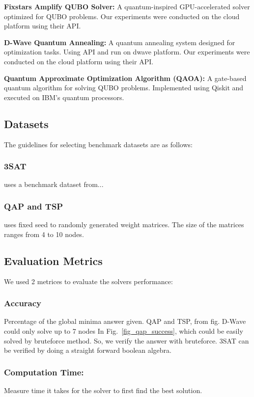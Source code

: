 \documentclass[conference]{IEEEtran}
\begin{document}
\textbf{Fixstars Amplify QUBO Solver:} A quantum-inspired GPU-accelerated solver optimized for QUBO problems. Our experiments were conducted on the cloud platform using their API.

\textbf{D-Wave Quantum Annealing:} A quantum annealing system designed for optimization tasks. Using API and run on dwave platform. Our experiments were conducted on the cloud platform using their API.

\textbf{Quantum Approximate Optimization Algorithm (QAOA):} A gate-based quantum algorithm for solving QUBO problems. Implemented using Qiskit and executed on IBM's quantum processors. 

\subsection{Datasets}
The guidelines for selecting benchmark datasets are as follows:

\subsubsection{3SAT} uses a benchmark dataset from... 
\subsubsection{QAP and TSP} uses fixed seed to randomly generated weight matrices. The size of the matrices ranges from 4 to 10 nodes.

\subsection{Evaluation Metrics}
We used 2 metrices to evaluate the solvers performance:

\subsubsection{Accuracy} Percentage of the global minima answer given. QAP and TSP, from fig. D-Wave could only solve up to 7 nodes In Fig.~\ref{fig_qap_success},  
which could be easily solved by bruteforce method. So, we verify the answer with bruteforce. 3SAT can be verified by doing a straight forward boolean algebra.
\subsubsection{Computation Time:} Measure time it takes for the solver to first find the best solution. 
\end{document}
